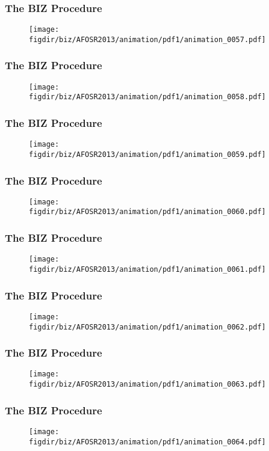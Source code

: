 \documentclass[13pt]{beamer}
\newcommand{\figdir}{../../fig}
\begin{document}
\begin{frame}\frametitle{The BIZ Procedure}\begin{figure}\texttt{[image: \\figdir/biz/AFOSR2013/animation/pdf1/animation\_0057.pdf]}\end{figure}\end{frame}
\begin{frame}\frametitle{The BIZ Procedure}\begin{figure}\texttt{[image: \\figdir/biz/AFOSR2013/animation/pdf1/animation\_0058.pdf]}\end{figure}\end{frame}
\begin{frame}\frametitle{The BIZ Procedure}\begin{figure}\texttt{[image: \\figdir/biz/AFOSR2013/animation/pdf1/animation\_0059.pdf]}\end{figure}\end{frame}
\begin{frame}\frametitle{The BIZ Procedure}\begin{figure}\texttt{[image: \\figdir/biz/AFOSR2013/animation/pdf1/animation\_0060.pdf]}\end{figure}\end{frame}
\begin{frame}\frametitle{The BIZ Procedure}\begin{figure}\texttt{[image: \\figdir/biz/AFOSR2013/animation/pdf1/animation\_0061.pdf]}\end{figure}\end{frame}
\begin{frame}\frametitle{The BIZ Procedure}\begin{figure}\texttt{[image: \\figdir/biz/AFOSR2013/animation/pdf1/animation\_0062.pdf]}\end{figure}\end{frame}
\begin{frame}\frametitle{The BIZ Procedure}\begin{figure}\texttt{[image: \\figdir/biz/AFOSR2013/animation/pdf1/animation\_0063.pdf]}\end{figure}\end{frame}
\begin{frame}\frametitle{The BIZ Procedure}\begin{figure}\texttt{[image: \\figdir/biz/AFOSR2013/animation/pdf1/animation\_0064.pdf]}\end{figure}\end{frame}
\end{document}
